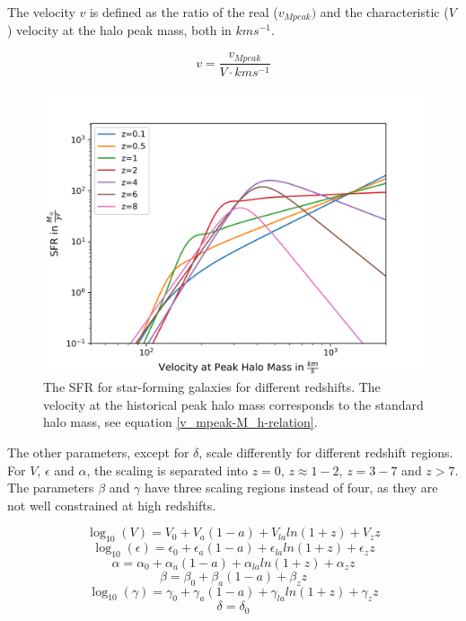 The velocity $v$ is defined as the ratio of the real ($v_{Mpeak})$ and the characteristic ($V$) velocity at the halo peak mass, both in $km s^{-1}$.

\begin{equation}
    v = \frac{v_{Mpeak}}{V \cdot km s^{-1}}
\end{equation}



\begin{figure}
    \centering
    \includegraphics[width=1\linewidth]{Images/sfr_of_v.png}
    \caption[The SFR for star-forming galaxies for different redshifts.]{The SFR for star-forming galaxies for different redshifts. The velocity at the historical peak halo mass corresponds to the standard halo mass, see equation \ref{v_mpeak-M_h-relation}.}
    \label{SFR_of_v}
\end{figure} 

The other parameters, except for $\delta$, scale differently for different redshift regions. For $V$, $\epsilon$ and $\alpha$, the scaling is separated into $z=0$, $z\approx 1-2$, $z=3-7$ and $z>7$. The parameters $\beta$ and $\gamma$ have three scaling regions instead of four, as they are not well constrained at high redshifts. 

\begin{equation}
    \log_{10}(V) = V_0 + V_a(1-a)+V_{la}ln(1+z)+V_z z
\end{equation}
\begin{equation}
    \log_{10}(\epsilon) = \epsilon_0 + \epsilon_a(1-a)+\epsilon_{la}ln(1+z)+\epsilon_z z
\end{equation}
\begin{equation}
    \alpha = \alpha_0 + \alpha_a(1-a)+\alpha_{la}ln(1+z)+\alpha_z z
\end{equation}
\begin{equation}
    \beta = \beta_0 + \beta_a(1-a)+\beta_z z
\end{equation}
\begin{equation}
    \log_{10}(\gamma) = \gamma_0 + \gamma_a(1-a)+\gamma_{la}ln(1+z)+\gamma_z z
\end{equation}
\begin{equation}
    \delta = \delta_0
\end{equation}



